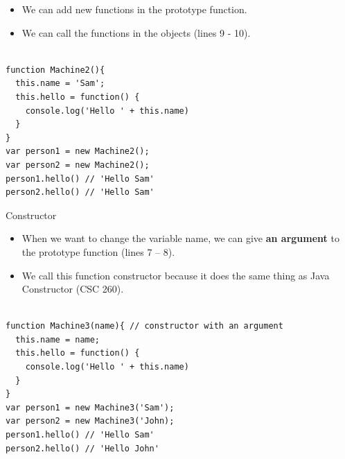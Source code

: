 \begin{frame}[fragile]{}

\begin{itemize}
	\item We can add new functions in the prototype function. 
	\item We can call the functions in the objects (lines 9 - 10).
\end{itemize}

\begin{Code}{}%
\begin{lstlisting}[firstnumber=1, label=glabels, xleftmargin=0pt, basicstyle=\scriptsize]% 

function Machine2(){
  this.name = 'Sam';
  this.hello = function() {
    console.log('Hello ' + this.name)
  }
}
var person1 = new Machine2(); 
var person2 = new Machine2(); 
person1.hello() // 'Hello Sam'
person2.hello() // 'Hello Sam'
\end{lstlisting}%
\end{Code}%
\end{frame}

\begin{frame}[fragile]{Constructor}

\begin{itemize}
	\item When we want to change the variable name, we can give \textbf{an argument} to the prototype function (lines 7 -- 8). 
	\item We call this function constructor because it does the same thing as Java Constructor (CSC 260). 
\end{itemize}

\begin{Code}{}%
\begin{lstlisting}[firstnumber=1, label=glabels, xleftmargin=0pt, basicstyle=\scriptsize]% 

function Machine3(name){ // constructor with an argument
  this.name = name;
  this.hello = function() {
    console.log('Hello ' + this.name)
  }
}
var person1 = new Machine3('Sam');
var person2 = new Machine3('John);
person1.hello() // 'Hello Sam'
person2.hello() // 'Hello John'
\end{lstlisting}%
\end{Code}%
\end{frame}

